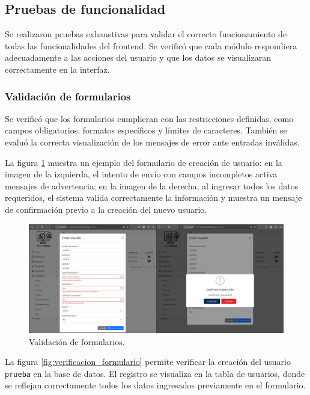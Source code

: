 \subsection{Pruebas de funcionalidad}

Se realizaron pruebas exhaustivas para validar el correcto funcionamiento de
todas las funcionalidades del frontend. Se verificó que cada módulo respondiera
adecuadamente a las acciones del usuario y que los datos se visualizaran
correctamente en la interfaz.

\subsubsection{Validación de formularios}

Se verificó que los formularios cumplieran con las restricciones definidas,
como campos obligatorios, formatos específicos y límites de caracteres. También
se evaluó la correcta visualización de los mensajes de error ante entradas
inválidas.

La figura \ref{fig:formulario} muestra un ejemplo del formulario de creación de
usuario: en la imagen de la izquierda, el intento de envío con campos
incompletos activa mensajes de advertencia; en la imagen de la derecha, al
ingresar todos los datos requeridos, el sistema valida correctamente la
información y muestra un mensaje de confirmación previo a la creación del nuevo
usuario.

\begin{figure}[H]
    \centering
    \includegraphics[width=\textwidth]{Images/44_formulario.png}
    \caption[Validación de formularios]{Validación de formularios.}
    \label{fig:formulario}
\end{figure}

La figura \ref{fig:verificacion_formulario} permite verificar la creación del
usuario \texttt{prueba} en la base de datos. El registro se visualiza en la
tabla de usuarios, donde se reflejan correctamente todos los datos ingresados
previamente en el formulario.

